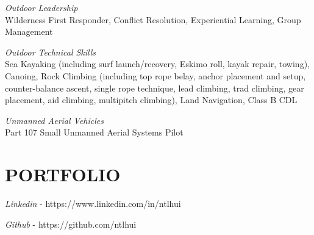 \documentclass[line,margin]{res}
\begin{document}
\begin{resume}
	{\sl Outdoor Leadership}\\
		Wilderness First Responder, Conflict Resolution, Experiential Learning, Group Management

	{\sl Outdoor Technical Skills}\\
		Sea Kayaking (including surf launch/recovery, Eskimo roll, kayak repair, towing), Canoing, Rock Climbing (including top rope belay, anchor placement and setup, counter-balance ascent, single rope technique, lead climbing, trad climbing, gear placement, aid climbing, multipitch climbing), Land Navigation, Class B CDL

	{\sl Unmanned Aerial Vehicles}\\
		Part 107 Small Unmanned Aerial Systems Pilot

\section{PORTFOLIO}
	{\sl Linkedin} - https://www.linkedin.com/in/ntlhui

	{\sl Github} - https://github.com/ntlhui
\end{resume}
\end{document}
